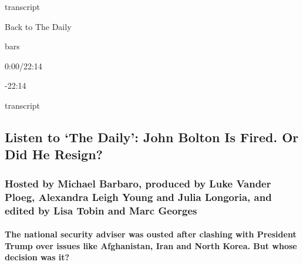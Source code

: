 transcript

Back to The Daily

bars

0:00/22:14

-22:14

transcript

\hypertarget{listen-to-the-daily-john-bolton-is-fired-or-did-he-resign-1}{%
\subsection{Listen to `The Daily': John Bolton Is Fired. Or Did He
Resign?}\label{listen-to-the-daily-john-bolton-is-fired-or-did-he-resign-1}}

\hypertarget{hosted-by-michael-barbaro-produced-by-luke-vander-ploeg-alexandra-leigh-young-and-julia-longoria-and-edited-by-lisa-tobin-and-marc-georges}{%
\subsubsection{Hosted by Michael Barbaro, produced by Luke Vander Ploeg,
Alexandra Leigh Young and Julia Longoria, and edited by Lisa Tobin and
Marc
Georges}\label{hosted-by-michael-barbaro-produced-by-luke-vander-ploeg-alexandra-leigh-young-and-julia-longoria-and-edited-by-lisa-tobin-and-marc-georges}}

\hypertarget{the-national-security-adviser-was-ousted-after-clashing-with-president-trump-over-issues-like-afghanistan-iran-and-north-korea-but-whose-decision-was-it}{%
\paragraph{The national security adviser was ousted after clashing with
President Trump over issues like Afghanistan, Iran and North Korea. But
whose decision was
it?}\label{the-national-security-adviser-was-ousted-after-clashing-with-president-trump-over-issues-like-afghanistan-iran-and-north-korea-but-whose-decision-was-it}}

